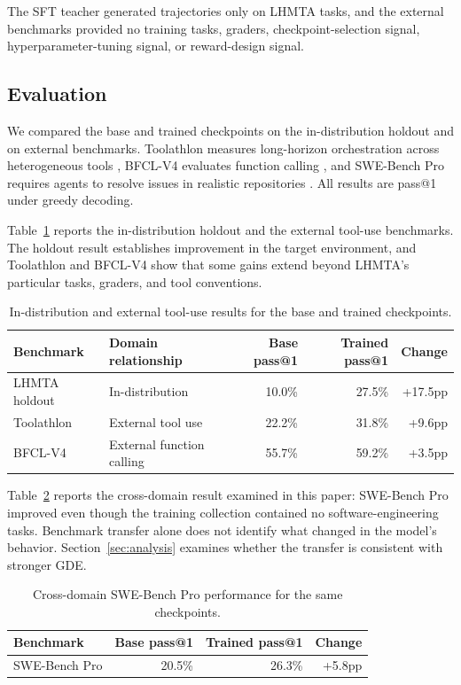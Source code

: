 \documentclass{article}
\begin{document}
The SFT teacher generated trajectories only on LHMTA tasks, and the external benchmarks provided no training tasks, graders, checkpoint-selection signal, hyperparameter-tuning signal, or reward-design signal.

\subsection{Evaluation}
\label{sec:evaluation}

We compared the base and trained checkpoints on the in-distribution holdout and on external benchmarks. Toolathlon measures long-horizon orchestration across heterogeneous tools \citep{li2025toolathlon}, BFCL-V4 evaluates function calling \citep{patil2025bfcl}, and SWE-Bench Pro requires agents to resolve issues in realistic repositories \citep{deng2025swebenchpro}. All results are pass@1 under greedy decoding.

Table~\ref{tab:toolresults} reports the in-distribution holdout and the external tool-use benchmarks. The holdout result establishes improvement in the target environment, and Toolathlon and BFCL-V4 show that some gains extend beyond LHMTA's particular tasks, graders, and tool conventions.

\begin{table}[H]
\centering
\caption{In-distribution and external tool-use results for the base and trained checkpoints.}
\label{tab:toolresults}
\begin{tabular}{llrrr}
\toprule
Benchmark & Domain relationship & Base pass@1 & Trained pass@1 & Change \\
\midrule
LHMTA holdout & In-distribution & 10.0\% & 27.5\% & +17.5pp \\
Toolathlon & External tool use & 22.2\% & 31.8\% & +9.6pp \\
BFCL-V4 & External function calling & 55.7\% & 59.2\% & +3.5pp \\
\bottomrule
\end{tabular}
\end{table}

Table~\ref{tab:sweresults} reports the cross-domain result examined in this paper: SWE-Bench Pro improved even though the training collection contained no software-engineering tasks. Benchmark transfer alone does not identify what changed in the model's behavior. Section~\ref{sec:analysis} examines whether the transfer is consistent with stronger GDE.

\begin{table}[H]
\centering
\caption{Cross-domain SWE-Bench Pro performance for the same checkpoints.}
\label{tab:sweresults}
\begin{tabular}{lrrr}
\toprule
Benchmark & Base pass@1 & Trained pass@1 & Change \\
\midrule
SWE-Bench Pro & 20.5\% & 26.3\% & +5.8pp \\
\bottomrule
\end{tabular}
\end{table}
\end{document}
